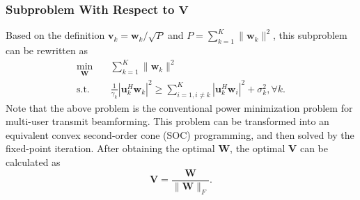 \subsubsection{Subproblem With Respect to $\mathbf{V}$} 
Based on the definition $\mathbf{v}_k = \mathbf{w}_k/\sqrt{P}$ and $P = \sum_{k=1}^K \|\mathbf{w}_k\|^2$, this subproblem can be rewritten as
\begin{subequations} \label{subproblem_W}
    \begin{align}
        \min_{\mathbf{W}} \quad &\sum_{k=1}^K \|\mathbf{w}_k\|^2 \\
        \mathrm{s.t.} \quad & \frac{1}{\gamma_k}\left| \mathbf{u}_k^H \mathbf{w}_k \right|^2 \ge \sum_{i=1, i \neq k}^K  \left| \mathbf{u}_k^H \mathbf{w}_i \right|^2 + \sigma_k^2, \forall k.
    \end{align}
\end{subequations}
Note that the above problem is the conventional power minimization problem for multi-user transmit beamforming. This problem can be transformed into an equivalent convex second-order cone (SOC) programming, and then solved by the fixed-point iteration. After obtaining the optimal $\mathbf{W}$, the optimal $\mathbf{V}$ can be calculated as 
\begin{equation}
    \mathbf{V} = \frac{\mathbf{W}}{\|\mathbf{W}\|_F}.
\end{equation}  

